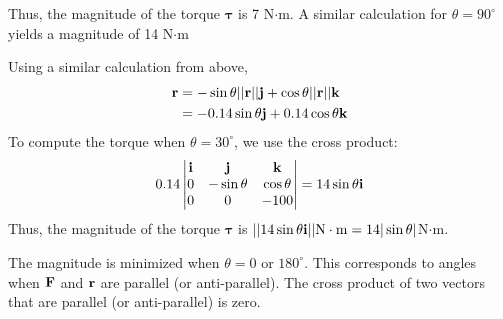 Thus, the magnitude of the torque $\boldsymbol\tau$ is 7 N$\cdot$m. A similar calculation for $\theta = 90^{\circ}$ yields a magnitude of 14 N$\cdot$m
\item Using a similar calculation from above, 
\begin{align*}
  \mathbf{r} &=- \sin\theta||\mathbf{r}||\mathbf{j} + \cos\theta||\mathbf{r}||\mathbf{k}\\
  &= -0.14\sin\theta\mathbf{j} + 0.14\cos\theta\mathbf{k}
\end{align*}
To compute the torque when $\theta = 30^{\circ}$, we use the cross product:
\begin{align*}
0.14
\begin{vmatrix}
   \mathbf{i} & \mathbf{j} &  \mathbf{k} \\
   0 & -\sin\theta &  \cos\theta \\
   0 & 0 & -100  \\
  \end{vmatrix}=14\sin\theta\mathbf{i}
\end{align*} 
Thus, the magnitude of the torque $\boldsymbol\tau$ is $|| 14\sin\theta\mathbf{i} || \text{N}\cdot\text{m} = 14 |\sin\theta|$N$\cdot$m.
\item The magnitude is minimized when $\theta = 0$ or $180^{\circ}$. This corresponds to angles when $\mathbf{F}$ and $\mathbf{r}$ are parallel (or anti-parallel). The cross product of two vectors that are parallel (or anti-parallel) is zero.  
\EEN
\item
